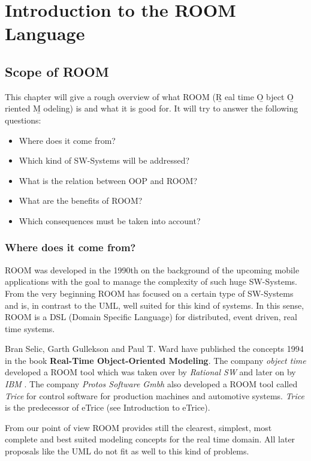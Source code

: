 \chapter{ Introduction to the ROOM Language}

\section{Scope of ROOM}

This chapter will give a rough overview of what ROOM (\b R eal time \b O bject \b O riented \b M odeling) is and what it
is good for. It will try to answer the following questions:

\begin{itemize}
\item Where does it come from?
\item Which kind of SW-Systems will be addressed?
\item What is the relation between OOP and ROOM?
\item What are the benefits of ROOM?
\item Which consequences must be taken into account?
\end{itemize}

\subsection{Where does it come from?}

ROOM was developed in the 1990th on the background of the upcoming mobile applications with the goal to
manage the complexity of such huge SW-Systems. From the very beginning ROOM has focused on a certain type
of SW-Systems and is, in contrast to the UML, well suited for this kind of systems. In this sense, ROOM is
a DSL (Domain Specific Language) for distributed, event driven, real time systems. 

Bran Selic, Garth Gullekson and Paul T. Ward have published the concepts 1994 in the book
\textbf{Real-Time Object-Oriented Modeling}. The company \textit{object time} \texttrademark
developed a ROOM tool which was taken over by \textit{Rational SW} \texttrademark and later
on by \textit{IBM} \texttrademark. 
The company \textit{Protos Software Gmbh} \texttrademark also developed a ROOM tool called
\textit{Trice} \texttrademark for control software for production machines and automotive systems.
\textit{Trice} \texttrademark is the predecessor of eTrice (see Introduction to eTrice). 
 
From our point of view ROOM provides still the clearest, simplest, most complete and best suited modeling
concepts for the real time domain. All later proposals like the UML do not fit as well to this kind of problems.
 

